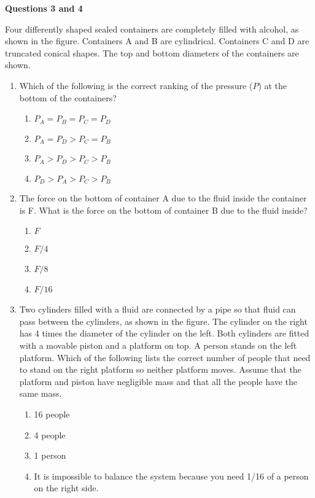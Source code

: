 \documentclass{../../../oss-apphys}
\begin{document}
\begin{multicols}{2}
  \textbf{Questions 3 and 4}

  Four differently shaped sealed containers are completely filled with alcohol,
  as shown in the figure. Containers A and B are cylindrical. Containers C and
  D are truncated conical shapes. The top and bottom diameters of the
  containers are shown.
  \begin{enumerate}[leftmargin=18pt,start=3]
    
  \item Which of the following is the correct ranking of the pressure ($P$) at
    the bottom of the containers?
    \begin{enumerate}[noitemsep,topsep=0pt,leftmargin=18pt,label=(\Alph*)]
    \item $P_A = P_B = P_C = P_D$
    \item $P_A = P_D > P_C = P_B$
    \item $P_A > P_D > P_C > P_B$
    \item $P_D > P_A > P_C > P_B$
    \end{enumerate}

  \item The force on the bottom of container A due to the fluid inside the
    container is F. What is the force on the bottom of container B due to
    the fluid inside?
    \begin{enumerate}[noitemsep,topsep=0pt,leftmargin=18pt,label=(\Alph*)]
    \item $F$
    \item $F/4$
    \item $F/8$
    \item $F/16$
    \end{enumerate}

    \columnbreak
    
  \item Two cylinders filled with a fluid are connected by a pipe so that fluid
    can pass between the cylinders, as shown in the figure. The cylinder
    on the right has 4 times the diameter of the cylinder on the left. Both
    cylinders are fitted with a movable piston and a platform on top. A
    person stands on the left platform. Which of the following lists the
    correct number of people that need to stand on the right platform so
    neither platform moves. Assume that the platform and piston have
    negligible mass and that all the people have the same mass.

    \vspace{-.1in}
    \begin{enumerate}[noitemsep,topsep=0pt,leftmargin=18pt,label=(\Alph*)]
    \item \num{16} people
    \item \num{4} people
    \item \num{1} person
    \item It is impossible to balance the system because you need 1/16 of a
      person on the right side.
    \end{enumerate}


\end{enumerate}
\end{multicols}
\end{document}
